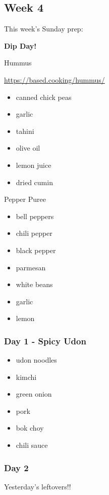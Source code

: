 \documentclass[11pt, a4paper]{article}
\begin{document}
\pagebreak
\subsection{Week 4}

This week's Sunday prep:
\par
\vspace{1pc}
\noindent\textbf{Dip Day!}
\par
Hummus
\par
\small{\url{https://based.cooking/hummus/}}
\par
\begin{itemize}
\item canned chick peas
\item garlic
\item tahini
\item olive oil
\item lemon juice
\item dried cumin
\end{itemize}

\vspace{1pc}

Pepper Puree
\begin{itemize}
\item bell peppers
\item chili pepper
\item black pepper
\item parmesan 
\item white beans
\item garlic
\item lemon 
\end{itemize}

\subsubsection{Day 1 - Spicy Udon}
\vspace{1pc}
\begin{itemize}
\item udon noodles
\item kimchi
\item green onion 
\item pork
\item bok choy
\item chili sauce
\end{itemize}

\subsubsection{Day 2}
\vspace{1pc}
Yesterday's leftovers!!
\end{document}
